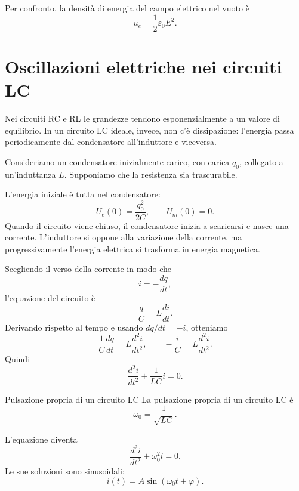 \documentclass[a4paper]{article}
\begin{document}
Per confronto, la densità di energia del campo elettrico nel vuoto è
\[
u_e=\frac{1}{2}\varepsilon_0E^2.
\]

\section{Oscillazioni elettriche nei circuiti LC}

Nei circuiti RC e RL le grandezze tendono esponenzialmente a un valore di equilibrio. In un circuito LC ideale, invece, non c'è dissipazione: l'energia passa periodicamente dal condensatore all'induttore e viceversa.

Consideriamo un condensatore inizialmente carico, con carica \(q_0\), collegato a un'induttanza \(L\). Supponiamo che la resistenza sia trascurabile.

\begin{center}
\end{center}

L'energia iniziale è tutta nel condensatore:
\[
U_e(0)=\frac{q_0^2}{2C},
\qquad
U_m(0)=0.
\]
Quando il circuito viene chiuso, il condensatore inizia a scaricarsi e nasce una corrente. L'induttore si oppone alla variazione della corrente, ma progressivamente l'energia elettrica si trasforma in energia magnetica.

Scegliendo il verso della corrente in modo che
\[
i=-\frac{dq}{dt},
\]
l'equazione del circuito è
\[
\frac{q}{C}=L\frac{di}{dt}.
\]
Derivando rispetto al tempo e usando \(dq/dt=-i\), otteniamo
\[
\frac{1}{C}\frac{dq}{dt}=L\frac{d^2i}{dt^2},
\qquad
-\frac{i}{C}=L\frac{d^2i}{dt^2}.
\]
Quindi
\[
\frac{d^2i}{dt^2}+\frac{1}{LC}i=0.
\]

\begin{snippetdefinition}{Pulsazione propria di un circuito LC}
La pulsazione propria di un circuito LC è
\[
    \omega_0=\frac{1}{\sqrt{LC}}.
\]
\end{snippetdefinition}

L'equazione diventa
\[
\frac{d^2i}{dt^2}+\omega_0^2 i=0.
\]
Le sue soluzioni sono sinusoidali:
\[
i(t)=A\sin(\omega_0t+\varphi).
\]
\end{document}
